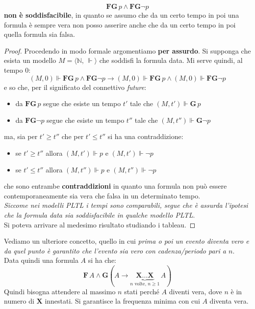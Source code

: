 \documentclass[a4paper,12pt, oneside]{book}
\begin{document}
\[\mathbf{FG}\,p\land \mathbf{FG}\neg p\]
\textbf{non è soddisfacibile}, in quanto se assumo che da un certo tempo in poi
una formula è sempre vera non posso asserire anche che da un certo tempo in poi
quella formula sia falsa.
\begin{proof}
  Procedendo in modo formale argomentiamo \textbf{per assurdo}.
  Si supponga che esista un modello $M=\langle \mathbb{N},\,\Vdash\rangle$ che
  soddisfi la formula data. Mi serve quindi, al tempo 0:
  \[(M,0)\Vdash \mathbf{FG}\,p\land \mathbf{FG}\neg p\to (M,0)\Vdash
    \mathbf{FG}\,p\land (M,0)\Vdash \mathbf{FG}\neg p\]
  e so che, per il significato del connettivo \emph{future}:
  \begin{itemize}
    \item da $\mathbf{FG}\,p$ segue che esiste un tempo $t'$ tale che
    $(M,t')\Vdash\mathbf{G}\,p$
    \item da $\mathbf{FG}\neg p$ segue che esiste un tempo $t''$ tale che
    $(M,t'')\Vdash\mathbf{G}\neg p$
  \end{itemize}
  ma, sia per $t'\geq t''$ che per $t'\leq t''$ si ha una contraddizione:
  \begin{itemize}
    \item se $t'\geq t''$ allora $(M,t')\Vdash p$ e $(M,t')\Vdash \neg p$
    \item se $t'\leq t''$ allora $(M,t'')\Vdash p$ e $(M,t'')\Vdash \neg p$
  \end{itemize}
  che sono entrambe \textbf{contraddizioni} in quanto una formula non può essere
  contemporaneamente sia vera che falsa in un determinato tempo.\\
  \textit{Siccome nei modelli PLTL i tempi sono comparabili, segue che è assurda
    l’ipotesi che la formula data sia soddisfacibile in qualche modello PLTL}.\\
  Si poteva arrivare al medesimo risultato studiando i tableau.
\end{proof}
Vediamo un ulteriore concetto, quello in cui \textit{prima o poi un evento
  diventa vero e da quel punto è garantito che l'evento sia vero con
  cadenza/periodo pari a $n$}. Data quindi una formula $A$ si ha che:
\[\mathbf{F}\,A\land\mathbf{G}(A\to\underbrace{
    \mathbf{X}\ldots\mathbf{X}}_{n\mbox{ volte, } n\geq 1}\,A)\]
Quindi bisogna attendere al massimo $n$ stati perché $A$ diventi vera, dove $n$
è in numero di $\mathbf{X}$ innestati. Si garantisce la frequenza minima con cui
$A$ diventa vera.
\end{document}
